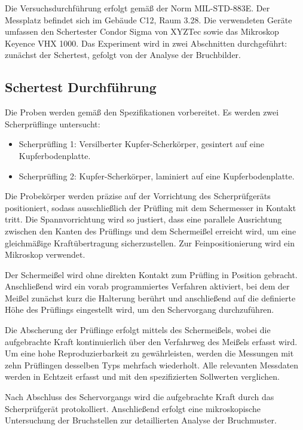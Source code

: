 Die Versuchsdurchführung erfolgt gemäß der Norm MIL-STD-883E. Der Messplatz befindet sich im Gebäude C12, Raum 3.28. Die verwendeten Geräte umfassen den Schertester Condor Sigma von XYZTec sowie das Mikroskop Keyence VHX 1000. Das Experiment wird in zwei Abschnitten durchgeführt: zunächst der Schertest, gefolgt von der Analyse der Bruchbilder.

\subsection{Schertest Durchführung}
Die Proben werden gemäß den Spezifikationen vorbereitet. Es werden zwei Scherprüflinge untersucht:
\begin{itemize}
    \item Scherprüfling 1: Versilberter Kupfer-Scherkörper, gesintert auf eine Kupferbodenplatte.
    \item     Scherprüfling 2: Kupfer-Scherkörper, laminiert auf eine Kupferbodenplatte.
\end{itemize}
Die Probekörper werden präzise auf der Vorrichtung des Scherprüfgeräts positioniert, sodass ausschließlich der Prüfling mit dem Schermesser in Kontakt tritt. Die Spannvorrichtung wird so justiert, dass eine parallele Ausrichtung zwischen den Kanten des Prüflings und dem Schermeißel erreicht wird, um eine gleichmäßige Kraftübertragung sicherzustellen. Zur Feinpositionierung wird ein Mikroskop verwendet.

Der Schermeißel wird ohne direkten Kontakt zum Prüfling in Position gebracht. Anschließend wird ein vorab programmiertes Verfahren aktiviert, bei dem der Meißel zunächst kurz die Halterung berührt und anschließend auf die definierte Höhe des Prüflings eingestellt wird, um den Schervorgang durchzuführen.

Die Abscherung der Prüflinge erfolgt mittels des Schermeißels, wobei die aufgebrachte Kraft kontinuierlich über den Verfahrweg des Meißels erfasst wird. Um eine hohe Reproduzierbarkeit zu gewährleisten, werden die Messungen mit zehn Prüflingen desselben Typs mehrfach wiederholt. Alle relevanten Messdaten werden in Echtzeit erfasst und mit den spezifizierten Sollwerten verglichen.

Nach Abschluss des Schervorgangs wird die aufgebrachte Kraft durch das Scherprüfgerät protokolliert. Anschließend erfolgt eine mikroskopische Untersuchung der Bruchstellen zur detaillierten Analyse der Bruchmuster.
